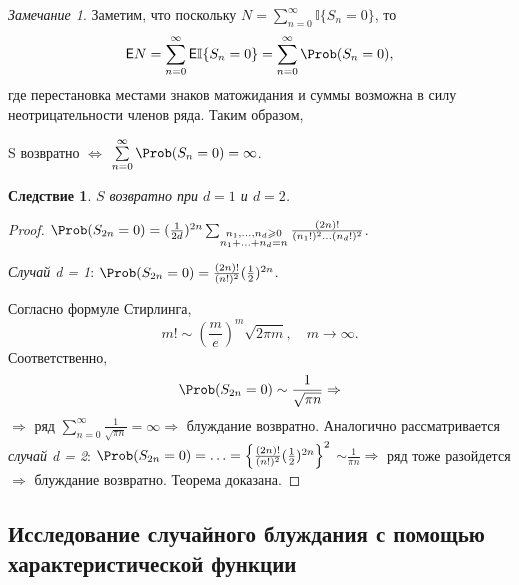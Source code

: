 \documentclass[a4paper]{article}
\newcommand{\Expect}{\mathsf{E}}
\newcommand{\ind}{\mathbb I}
\theoremstyle{plain}
\newtheorem*{cor}{Следствие}
\theoremstyle{definition}
\theoremstyle{remark}
\newtheorem*{rem}{Замечание}
\begin{document}
\begin{rem}
  Заметим, что поскольку $N = \sum\limits_{n=0}^{\infty} \ind \lbrace S_{n} = 0 \rbrace$, то
  \begin{equation*}
    \Expect N = \sum_{n=0}^{\infty} \Expect \ind \lbrace S_{n} = 0 \rbrace = \sum\limits_{n=0}^{\infty} \Prob(S_{n} = 0),
  \end{equation*}
  где перестановка местами знаков матожидания и суммы возможна в силу неотрицательности членов ряда. Таким образом, \begin{center}
    S возвратно $\Leftrightarrow$ $\sum\limits_{n=0}^{\infty} \Prob(S_{n} = 0) = \infty$.
  \end{center}
\end{rem}

\begin{cor}
  $S$ возвратно при $d = 1$ и $d = 2$.
\end{cor}

\begin{proof}
  $\Prob(S_{2n} = 0) = (\frac{1}{2d})^{2n} \sum_{\substack{n_{1}, \ldots, n_{d} \geqslant 0 \\ n_{1} + \ldots + n_{d} = n}} \frac{(2n)!}{(n_{1}!)^{2} \ldots (n_{d}!)^{2}}$.
  \begin{flushleft}
    \emph{Случай d = 1}: $\Prob(S_{2n} = 0) = \frac{(2n)!}{(n!)^{2}}(\frac{1}{2})^{2n}$.
  \end{flushleft}Согласно формуле Стирлинга,
  \begin{equation*}
    m! \sim \left(\frac{m}{e}\right)^{m} \sqrt{2 \pi m}, \quad m \rightarrow \infty.
  \end{equation*}
  Соответственно,
  \begin{equation*}
    \Prob(S_{2n} = 0) \sim \frac{1}{\sqrt{\pi n}} \Rightarrow
  \end{equation*}
  $\Rightarrow$ ряд $\sum\limits_{n=0}^{\infty} \frac{1}{\sqrt{\pi n}} = \infty \Rightarrow$ блуждание возвратно.
  Аналогично рассматривается \emph{случай d = 2}: $\Prob(S_{2n} = 0) = \ldots = \left\lbrace \frac{(2n)!}{(n!)^{2}}(\frac{1}{2})^{2n} \right\rbrace ^{2}$ $\sim \frac{1}{\pi n} \Rightarrow$ ряд тоже разойдется $\Rightarrow$ блуждание возвратно. Теорема доказана.
\end{proof}

\subsection{Исследование случайного блуждания с помощью характеристической функции}
\end{document}

